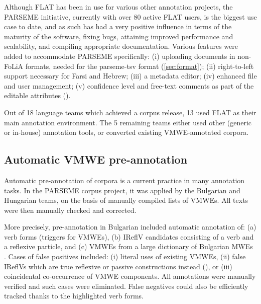 \documentclass[output=paper,
modfonts,
]{langscibook}
\begin{document}
Although FLAT has been in use for various other annotation projects, the PARSEME initiative, currently with over 80 active FLAT users, %
is the biggest use case to
date, and as such has had a very positive influence in terms of the maturity of the software, fixing bugs, attaining improved
performance and scalability, and compiling appropriate documentation. 
Various features were added to accommodate PARSEME specifically: (i) uploading documents in non-FoLiA formats, needed for the parseme-tsv format (\ref{sec:format}); (ii) right-to-left support necessary for Farsi and Hebrew; (iii) a metadata editor; (iv) enhanced file and user management; (v) confidence level and free-text comments as part of the editable attributes ().

Out of 18 language teams which achieved a corpus release, 13 used FLAT as their main annotation environment. The 5 remaining teams either used other (generic or in-house) annotation tools, or converted existing VMWE-annotated corpora. 

\subsection{Automatic VMWE pre-annotation}
\label{sec:pre-annot}
%
Automatic pre-annotation of corpora is a current practice in many annotation tasks. In the PARSEME corpus project, it was applied by the Bulgarian and Hungarian teams, on the basis of manually compiled lists of VMWEs. All texts were then manually checked and corrected.

More precisely, pre-annotation in Bulgarian included automatic annotation of: (a) verb forms (triggers for VMWEs), (b) IReflV candidates consisting of a verb and a reflexive particle, and (c) VMWEs from a large dictionary of Bulgarian MWEs \citep{Koeva2016}. Cases of false positives included: (i) literal uses of existing VMWEs, (ii) false IReflVs which are true reflexive or passive constructions instead (), or (iii) coincidental co-occurrence of VMWE components. All annotations were manually verified and such cases were eliminated. False negatives could also be efficiently tracked thanks to the highlighted verb forms.
\end{document}
